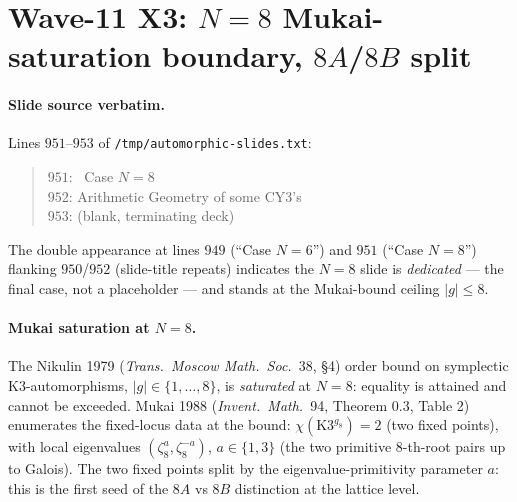 
\providecommand{\kBKM}{\kappa_{\mathrm{BKM}}}
\providecommand{\kch}{\kappa_{\mathrm{ch}}}
\providecommand{\kcat}{\kappa_{\mathrm{cat}}}
\providecommand{\kfib}{\kappa_{\mathrm{fiber}}}
\providecommand{\K}{\mathrm{K3}}
\providecommand{\Fix}{\mathrm{Fix}}
\providecommand{\Aut}{\mathrm{Aut}}
\providecommand{\symp}{\mathrm{symp}}
\providecommand{\Mp}{\mathrm{Mp}}
\providecommand{\Sp}{\mathrm{Sp}}
\providecommand{\ZZ}{\mathbb{Z}}
\providecommand{\CC}{\mathbb{C}}
\providecommand{\fsg}{\mathfrak{sg}}
\providecommand{\fg}{\mathfrak{g}}
\providecommand{\ClaimStatusTheorem}{\textbf{[Theorem]}}
\providecommand{\ClaimStatusConjectured}{\textbf{[Conjectured]}}

\section*{Wave-11 X3: $N=8$ Mukai-saturation boundary, $8A$/$8B$ split}
\label{wn:sec:wave11-x3-slides-N8-mukai-saturation}

\paragraph{Slide source verbatim.} Lines $951$--$953$ of
\texttt{/tmp/automorphic-slides.txt}:
\begin{quote}\small
$951$: \textbullet\ Case $N = 8$\\
$952$: Arithmetic Geometry of some CY3's\\
$953$: (blank, terminating deck)
\end{quote}
The double appearance at lines $949$ (``Case $N=6$'') and $951$
(``Case $N=8$'') flanking $950$/$952$ (slide-title repeats) indicates
the $N=8$ slide is \emph{dedicated} --- the final case, not a
placeholder --- and stands at the Mukai-bound ceiling $|g|\leq 8$.

\paragraph{Mukai saturation at $N=8$.} The Nikulin 1979
(\emph{Trans.\ Moscow Math.\ Soc.}~38, \S4) order bound on
symplectic K3-automorphisms, $|g|\in\{1,\ldots,8\}$, is
\emph{saturated} at $N=8$: equality is attained and cannot be
exceeded. Mukai 1988 (\emph{Invent.\ Math.}~94, Theorem 0.3, Table 2)
enumerates the fixed-locus data at the bound: $\chi(\K^{g_8})=2$
(two fixed points), with local eigenvalues
$(\zeta_8^{a}, \zeta_8^{-a})$, $a\in\{1,3\}$ (the two primitive
$8$-th-root pairs up to Galois). The two fixed points split by the
eigenvalue-primitivity parameter $a$: this is the first seed of the
$8A$ vs $8B$ distinction at the lattice level.

